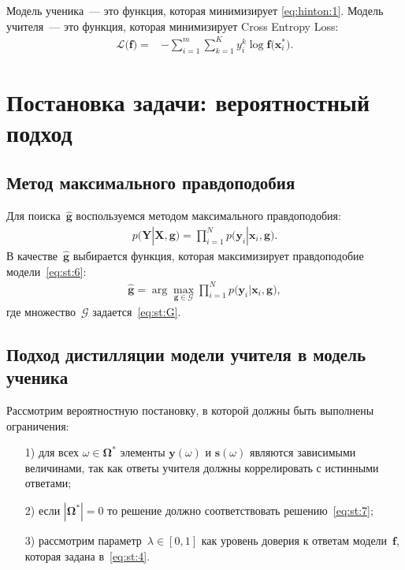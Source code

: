 \documentclass[12pt, twoside]{article}
\begin{document}
Модель ученика~--- это функция, которая минимизирует \eqref{eq:hinton:1}. Модель учителя~--- это функция, которая минимизирует Cross Entropy Loss:
\[
\label{eq:hinton.2}
\begin{aligned}
   \mathcal{L}\bigr(\mathbf{f}\bigr) = &-\sum_{i=1}^{m}{{\sum_{k=1}^{K}y^k_i\log\mathbf{f}\bigr(\mathbf{x}^*_i\bigr)}}.
   \end{aligned}
\]

\section{Постановка задачи: вероятностный подход}
\subsection{Метод максимального правдоподобия}
Для поиска~$\hat{\mathbf{g}}$ воспользуемся методом максимального правдоподобия:
\[
\label{eq:st:6}
\begin{aligned}
p\bigr(\mathbf{Y}|\mathbf{X}, \mathbf{g}\bigr) = \prod_{i=1}^{N}p\bigr(\mathbf{y}_{i}|\mathbf{x}_i, \mathbf{g}\bigr).
\end{aligned}
\]
В качестве~$\hat{\mathbf{g}}$ выбирается функция, которая максимизирует правдоподобие модели~\eqref{eq:st:6}:
\[
\label{eq:st:7}
\begin{aligned}
\hat{\mathbf{g}} = \arg\max_{\mathbf{g}\in \mathcal{G}} \prod_{i=1}^{N}p\bigr(\mathbf{y}_{i}|\mathbf{x}_i, \mathbf{g}\bigr),
\end{aligned}
\]
где множество~$\mathcal{G}$ задается~\eqref{eq:st:G}.
\subsection{Подход дистилляции модели учителя в модель ученика}
Рассмотрим вероятностную постановку, в которой должны быть выполнены ограничения:
\begin{enumerate}
	\item[1)] для всех $\omega \in \bm{\Omega}^*$ элементы $\mathbf{y}(\omega)$ и $\mathbf{s}(\omega)$ являются зависимыми величинами, так как ответы учителя должны коррелировать с истинными ответами;
	\item[2)] если $|\bm{\Omega}^*|=0$ то решение должно соответствовать решению~\eqref{eq:st:7};
	\item[3)] рассмотрим параметр~$\lambda\in[0,1]$ как уровень доверия к ответам модели~$\mathbf{f}$, которая задана в~\eqref{eq:st:4}.
\end{enumerate}
\end{document}
